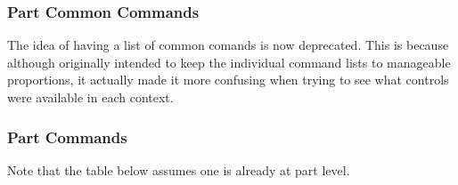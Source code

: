 \subsubsection{Part Common Commands}
\label{subsec:command_line_part_common_commands}
The idea of having a list of common comands is now deprecated. This is
because although originally intended to keep the individual command lists to
manageable proportions, it actually made it more confusing when trying
to see what controls were available in each context.

\subsubsection{Part Commands}
\label{subsec:command_line_part_commands}

   Note that the table below assumes one is already at part level.

